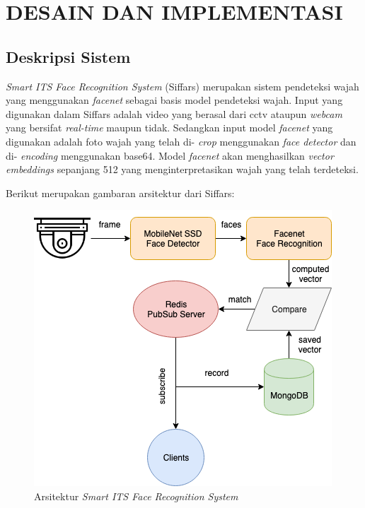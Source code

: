 \chapter{DESAIN DAN IMPLEMENTASI}


\section{Deskripsi Sistem}

\textit{Smart ITS Face Recognition System} (Siffars) merupakan sistem pendeteksi wajah yang menggunakan \textit{facenet} sebagai basis model pendeteksi wajah.
Input yang digunakan dalam Siffars adalah video yang berasal dari cctv ataupun \textit{webcam} yang bersifat \textit{real-time} maupun tidak. 
Sedangkan input model \textit{facenet} yang digunakan adalah foto wajah yang telah di- \textit{crop} menggunakan \textit{face detector} dan di- \textit{encoding} menggunakan base64.
Model \textit{facenet} akan menghasilkan \textit{vector embeddings} sepanjang 512 yang menginterpretasikan wajah yang telah terdeteksi.

Berikut merupakan gambaran arsitektur dari Siffars:

\begin{figure} [ht] \centering
  \includegraphics[scale=0.4]{gambar/sfa.png}
  \caption{Arsitektur \textit{Smart ITS Face Recognition System}}
  \label{fig:SpaceShuttle}
\end{figure}

